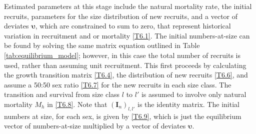 \documentclass[12pt,letterpaper]{article}
\begin{document}
      Estimated parameters at this stage include the natural mortality rate, the initial recruits, parameters for the size distribution of new recruits, and a vector of deviates $\bm{\upsilon}$, which are constrained to sum to zero, that represent historical variation in recruitment and or mortality \eqref{T6.1}.  The initial numbers-at-size can be found by solving the same matrix equation outlined in Table \ref{tab:equilibrium_model}; however, in this case the total number of recruits is used, rather than assuming unit recruitment.  This first proceeds by calculating the growth transition matrix \eqref{T6.4}, the distribution of new recruits \eqref{T6.6}, and assume a 50:50 sex ratio \eqref{T6.7} for the new recruits in each size class.  The transition and survival from size class $l$ to $l'$ is assumed to involve only natural mortality $M_h$ in \eqref{T6.8}.  Note that $(\bm{I}_n)_{l,l'}$ is the identity matrix.  The initial numbers at size, for each sex, is given by \eqref{T6.9}, which is just the equilibrium vector of numbers-at-size multiplied by a vector of deviates $\bm{\upsilon}$.
\end{document}

